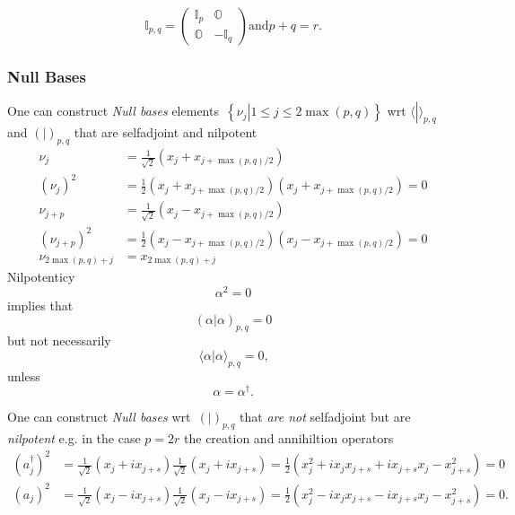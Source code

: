 \documentclass[aps, preprint]{revtex4}
\begin{document}
\begin{equation}\mathbb{I}_{p ,q} =\left (\begin{array}{cc}\mathbb{I}_{p} & \mathbb{O} \\
\mathbb{O} &  -\mathbb{I}_{q}\end{array}\right )\text{and}p +q =r\text{.}
\end{equation}

\subsubsection{Null Bases}
One can construct \emph{Null bases }elements\emph{\ }$\left \{\left .\nu _{j}\right \vert 1 \leq j \leq 2 \max \left (p ,q\right )\right \}$ wrt $ \langle \left .\text{}\right \vert  \rangle _{p ,q}$ and $\left (\left .\text{}\right \vert \right )_{p ,q}$ that are selfadjoint and nilpotent
\begin{align}\nu _{j} &  =\frac{1}{\sqrt{2}} \left (x_{j} +x_{j +\max \left (p ,q\right )/2}\right ) \\
\left (\nu _{j}\right )^{2} &  =\frac{1}{2} \left (x_{j} +x_{j +\max \left (p ,q\right )/2}\right ) \left (x_{j} +x_{j +\max \left (p ,q\right )/2}\right ) =0 \\
\nu _{j +p} &  =\frac{1}{\sqrt{2}} \left (x_{j} -x_{j +\max \left (p ,q\right )/2}\right ) \\
\left (\nu _{j +p}\right )^{2} &  =\frac{1}{2} \left (x_{j} -x_{j +\max \left (p ,q\right )/2}\right ) \left (x_{j} -x_{j +\max \left (p ,q\right )/2}\right ) =0 \\
\nu _{2 \max \left (p ,q\right ) +j} &  =x_{2 \max \left (p ,q\right ) +j}\end{align}Nilpotenticy
\begin{equation}\alpha ^{2} =0
\end{equation}implies that
\begin{equation}\left (\left .\alpha \right \vert \alpha \right )_{p ,q} =0
\end{equation}but not necessarily
\begin{equation} \langle \left .\alpha \right \vert \alpha  \rangle _{p ,q} =0\text{,}
\end{equation}unless
\begin{equation}\alpha  =\alpha ^{ \dag }\text{.}
\end{equation}

One can construct \emph{Null bases }wrt\emph{\ }$\left (\left .\text{}\right \vert \right )_{p ,q}$ that \emph{are not }selfadjoint but are \emph{nilpotent} e.g. in the case $p =2 r$ the creation and annihiltion operators
\begin{align}\left (a_{j}^{ \dag }\right )^{2} &  =\frac{1}{\sqrt{2}} \left (x_{j} +i x_{j +s}\right ) \frac{1}{\sqrt{2}} \left (x_{j} +i x_{j +s}\right ) =\frac{1}{2} \left (x_{j}^{2} +i x_{j} x_{j +s} +i x_{j +s} x_{j} -x_{j +s}^{2}\right ) =0 \\
\left (a_{j}\right )^{2} &  =\frac{1}{\sqrt{2}} \left (x_{j} -i x_{j +s}\right ) \frac{1}{\sqrt{2}} \left (x_{j} -i x_{j +s}\right ) =\frac{1}{2} \left (x_{j}^{2} -i x_{j} x_{j +s} -i x_{j +s} x_{j} -x_{j +s}^{2}\right ) =0.\end{align}
\end{document}
